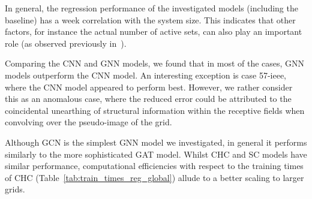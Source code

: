 \documentclass[journal]{IEEEtran}
\begin{document}
In general, the regression performance of the investigated models (including the baseline) has a week correlation with the system size.
This indicates that other factors, for instance the actual number of active sets, can also play an important role (as observed previously in~\cite{Robson2020}).

Comparing the CNN and GNN models, we found that in most of the cases, GNN models outperform the CNN model.
An interesting exception is case 57-ieee, where the CNN model appeared to perform best.
However, we rather consider this as an anomalous case, where the reduced error could be attributed to the coincidental unearthing of structural information within the receptive fields when convolving over the pseudo-image of the grid.

Although GCN is the simplest GNN model we investigated, in general it performs similarly to the more sophisticated GAT model.
Whilst CHC and SC models have similar performance, computational efficiencies with respect to the training times of CHC (Table~\ref{tab:train_times_reg_global}) allude to a better scaling to larger grids.
\end{document}
